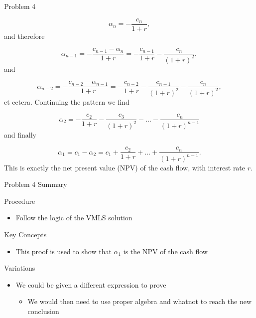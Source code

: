 \begin{problem}{Problem 4}
\begin{highlight}[Solution]
        \begin{equation*}
            \alpha_{n} = -\frac{c_{n}}{1 + r},
        \end{equation*}
        and therefore

        \begin{equation*}
            \alpha_{n - 1} = -\frac{c_{n - 1} - \alpha_{n}}{1 + r} = -\frac{c_{n - 1}}{1 + r} - \frac{c_{n}}{(1 + r)^2},
        \end{equation*}
        and 

        \begin{equation*}
            \alpha_{n - 2} = -\frac{c_{n -2} - \alpha_{n - 1}}{1 + r} = -\frac{c_{n - 2}}{1 + r} - \frac{c_{n - 1}}{(1 + r)^{2}} - \frac{c_{n}}{(1 + r)^{2}},
        \end{equation*}
        et cetera. Continuing the pattern we find

        \begin{equation*}
            \alpha_{2} = -\frac{c_{2}}{1 + r} -\frac{c_{3}}{(1 + r)^{2}} - \dots - \frac{c_{n}}{(1 + r)^{n-1}}
        \end{equation*}
        and finally

        \begin{equation*}
            \alpha_{1} = c_{1} - \alpha_{2} = c_{1} + \frac{c_{2}}{1 + r} + \dots + \frac{c_{n}}{(1 + r)^{n - 1}}.
        \end{equation*}
        This is exactly the net present value (NPV) of the cash flow, with interest rate $r$.
    \end{highlight}
\end{problem}

\begin{summary}{Problem 4 Summary}
    \begin{statement}{Procedure}
        \begin{itemize}
            \item Follow the logic of the VMLS solution
        \end{itemize}
    \end{statement}
    \begin{statement}{Key Concepts}
        \begin{itemize}
            \item This proof is used to show that $\alpha_{1}$ is the NPV of the cash flow
        \end{itemize}
    \end{statement}
    \begin{statement}{Variations}
        \begin{itemize}
            \item We could be given a different expression to prove
            \begin{itemize}
                \item We would then need to use proper algebra and whatnot to reach the new conclusion
            \end{itemize}
        \end{itemize}
    \end{statement}
\end{summary}

